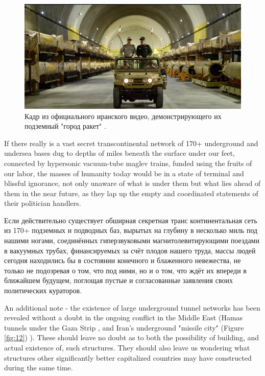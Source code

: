 \documentclass[10pt,twocolumn,letterpaper]{article}
\begin{document}
\begin{figure}[t]
\begin{center}
   \includegraphics[width=1\linewidth]{iran.jpeg}
\end{center}
   \caption{Кадр из официального иранского видео, демонстрирующего их подземный "город ракет" \cite{39,40}.}
\label{fig:12}
\label{fig:onecol}
\end{figure}
If there really is a vast secret transcontinental network of 170+ underground and undersea bases dug to depths of miles beneath the surface under our feet, connected by hypersonic vacuum-tube maglev trains, funded using the fruits of our labor, the masses of humanity today would be in a state of terminal and blissful ignorance, not only unaware of what is under them but what lies ahead of them in the near future, as they lap up the empty and coordinated statements of their politician handlers.

Если действительно существует обширная секретная транс континентальная сеть из 170+ подземных и подводных баз, вырытых на глубину в несколько миль под нашими ногами, соединённых гиперзвуковыми магнитолевитирующими поездами в вакуумных трубах, финансируемых за счёт плодов нашего труда, массы людей сегодня находились бы в состоянии конечного и блаженного невежества, не только не подозревая о том, что под ними, но и о том, что ждёт их впереди в ближайшем будущем, поглощая пустые и согласованные заявления своих политических кураторов.

An additional note - the existence of large underground tunnel networks has been revealed without a doubt in the ongoing conflict in the Middle East (Hamas tunnels under the Gaza Strip \cite{38}, and Iran's underground "missile city" (Figure \ref{fig:12}) \cite{39,40}). These should leave no doubt as to both the possibility of building, and actual existence of, such structures. They should also leave us wondering what structures other significantly better capitalized countries may have constructed during the same time.
\end{document}
